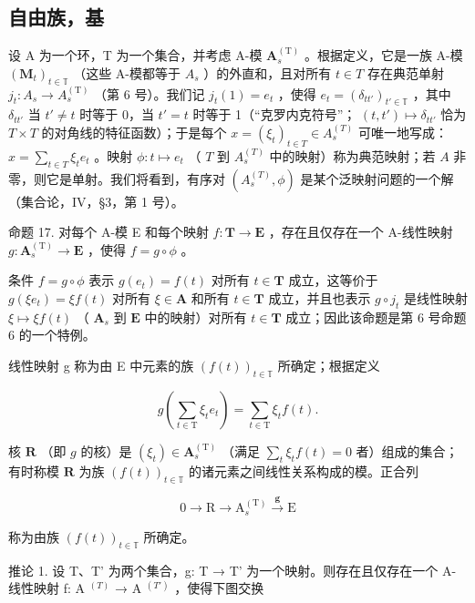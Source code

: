 \subsection{自由族，基}

设 A 为一个环，T 为一个集合，并考虑 A-模 \(\mathbf{A}_{s}^{\mathrm{(T)}}\) 。根据定义，它是一族 A-模 \((\mathbf{M}_{t})_{t\in\mathbb{T}}\) （这些 A-模都等于 \(A_{s}\) ）的外直和，且对所有 \(t\in T\) 存在典范单射 \(j_{t}:A_{s}\to A_{s}^{\mathrm{(T)}}\) （第 6 号）。我们记 \(j_{t}(1) = e_{t}\) ，使得 \(e_{t} = (\delta_{tt'})_{t' \in \mathbb{T}}\) ，其中 \(\delta_{tt'}\) 当 \(t' \neq t\) 时等于 0，当 \(t' = t\) 时等于 1（“克罗内克符号”； \((t, t') \mapsto \delta_{tt'}\) 恰为 \(T \times T\) 的对角线的特征函数）；于是每个 \(x = (\xi_{t})_{t \in T} \in A_{s}^{(T)}\) 可唯一地写成： \(x = \sum_{t \in T} \xi_{t} e_{t}\) 。映射 \(\phi: t \mapsto e_{t}\) （ \(T\) 到 \(A_{s}^{(T)}\) 中的映射）称为典范映射；若 \(A\) 非零，则它是单射。我们将看到，有序对 \((A_{s}^{(T)}, \phi)\) 是某个泛映射问题的一个解（集合论，IV，§3，第 1 号）。

命题 17. 对每个 A-模 E 和每个映射 \(f: \mathbf{T} \to \mathbf{E}\) ，存在且仅存在一个 A-线性映射 \(g: \mathbf{A}_{s}^{(\mathrm{T})} \to \mathbf{E}\) ，使得 \(f = g \circ \phi\) 。

条件 \(f = g \circ \phi\) 表示 \(g(e_t) = f(t)\) 对所有 \(t \in \mathbf{T}\) 成立，这等价于 \(g(\xi e_t) = \xi f(t)\) 对所有 \(\xi \in \mathbf{A}\) 和所有 \(t \in \mathbf{T}\) 成立，并且也表示 \(g \circ j_t\) 是线性映射 \(\xi \mapsto \xi f(t)\) （ \(\mathbf{A}_s\) 到 \(\mathbf{E}\) 中的映射）对所有 \(t \in \mathbf{T}\) 成立；因此该命题是第 6 号命题 6 的一个特例。

线性映射 g 称为由 E 中元素的族 \((f(t))_{t\in\mathbb{T}}\) 所确定；根据定义

\[
g \left(\sum_ {t \in \mathrm{T}} \xi_ {t} e _ {t}\right) = \sum_ {t \in \mathrm{T}} \xi_ {t} f (t).\tag{43}
\]

核 \(\mathbf{R}\) （即 \(g\) 的核）是 \((\xi_t) \in \mathbf{A}_s^{(\mathrm{T})}\) （满足 \(\sum_{t} \xi_t f(t) = 0\) 者）组成的集合；有时称模 \(\mathbf{R}\) 为族 \((f(t))_{t \in \mathbb{T}}\) 的诸元素之间线性关系构成的模。正合列

\[
0 \longrightarrow \mathrm{R} \longrightarrow \mathrm{A} _ {s} ^ {(\mathrm{T})} \stackrel {\mathbf {g}} {\longrightarrow} \mathrm{E}\tag{44}
\]

称为由族 \((f(t))_{t\in\mathbb{T}}\) 所确定。

推论 1. 设 T、T' 为两个集合，g: T → T' 为一个映射。则存在且仅存在一个 A-线性映射 f: A \(^{(T)}\) → A \(^{(T')}\) ，使得下图交换

